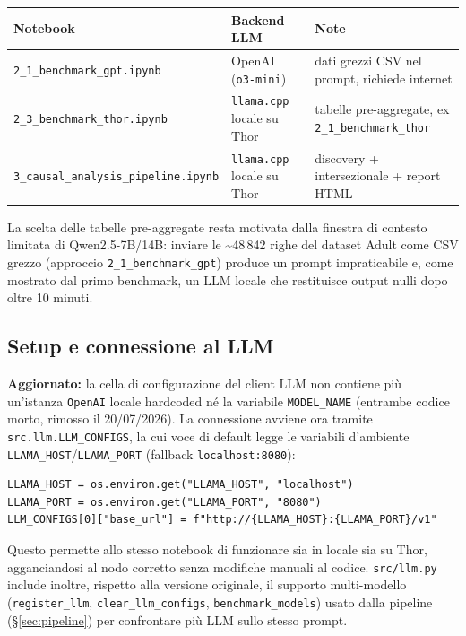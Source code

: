 \begin{center}
\begin{tabular}{lll}
\toprule
Notebook & Backend LLM & Note \\
\midrule
\texttt{2\_1\_benchmark\_gpt.ipynb} & OpenAI (\texttt{o3-mini}) & dati grezzi CSV nel prompt, richiede internet \\
\texttt{2\_3\_benchmark\_thor.ipynb} & \texttt{llama.cpp} locale su Thor & tabelle pre-aggregate, ex \texttt{2\_1\_benchmark\_thor} \\
\texttt{3\_causal\_analysis\_pipeline.ipynb} & \texttt{llama.cpp} locale su Thor & discovery + intersezionale + report HTML \\
\bottomrule
\end{tabular}
\end{center}

La scelta delle tabelle pre-aggregate resta motivata dalla finestra di contesto limitata di Qwen2.5-7B/14B: inviare le \textasciitilde 48\,842 righe del dataset Adult come CSV grezzo (approccio \texttt{2\_1\_benchmark\_gpt}) produce un prompt impraticabile e, come mostrato dal primo benchmark, un LLM locale che restituisce output nulli dopo oltre 10 minuti.

\subsection{Setup e connessione al LLM}

\textbf{Aggiornato:} la cella di configurazione del client LLM non contiene pi\`u un'istanza \texttt{OpenAI} locale hardcoded n\'e la variabile \texttt{MODEL\_NAME} (entrambe codice morto, rimosso il 20/07/2026). La connessione avviene ora tramite \texttt{src.llm.LLM\_CONFIGS}, la cui voce di default legge le variabili d'ambiente \texttt{LLAMA\_HOST}/\texttt{LLAMA\_PORT} (fallback \texttt{localhost:8080}):

\begin{verbatim}
LLAMA_HOST = os.environ.get("LLAMA_HOST", "localhost")
LLAMA_PORT = os.environ.get("LLAMA_PORT", "8080")
LLM_CONFIGS[0]["base_url"] = f"http://{LLAMA_HOST}:{LLAMA_PORT}/v1"
\end{verbatim}

Questo permette allo stesso notebook di funzionare sia in locale sia su Thor, agganciandosi al nodo corretto senza modifiche manuali al codice. \texttt{src/llm.py} include inoltre, rispetto alla versione originale, il supporto multi-modello (\texttt{register\_llm}, \texttt{clear\_llm\_configs}, \texttt{benchmark\_models}) usato dalla pipeline (\S\ref{sec:pipeline}) per confrontare pi\`u LLM sullo stesso prompt.

